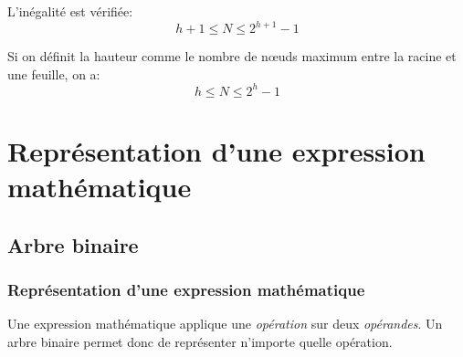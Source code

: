\documentclass[svgnames,11pt]{beamer}
\begin{document}
\begin{frame}
    \frametitle{}

    \begin{aretenir}[]
        L'inégalité est vérifiée:
        $$h+1 \leqslant N \leqslant 2^{h+1}-1$$
    \end{aretenir}
    \begin{aretenir}[Remarque]


        Si on définit la hauteur comme le nombre de nœuds maximum entre la racine et une feuille, on a: $$h \leqslant N \leqslant 2^{h}-1$$

    \end{aretenir}
\end{frame}
\section{Représentation d'une expression mathématique}
\subsection{Arbre binaire}
\begin{frame}
    \frametitle{Représentation d'une expression mathématique}

    Une expression mathématique applique une \emph{opération} sur deux \emph{opérandes}. Un arbre binaire permet donc de représenter n'importe quelle opération.
    \begin{center}
        \label{arbre}
    \end{center}

\end{frame}
\end{document}
